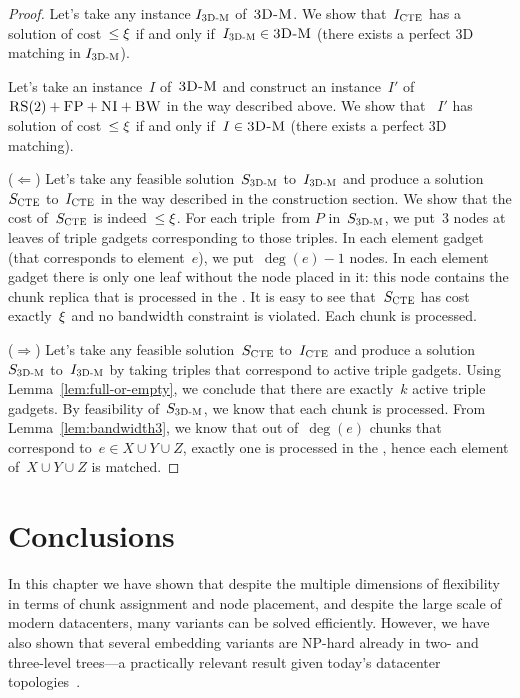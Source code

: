 \begin{proof}
  Let's take any instance $I_{\mathrm{\textsc{3D-M}}}$ of~$\textsc{3D-M}$.
  We show that~$I_{\mathrm{\textsc{CTE}}}$ has a solution of cost~$\leq \xi$ if and only if~$I_{\mathrm{\textsc{3D-M}}} \in \textsc{3D-M}$ (there exists a perfect 3D matching in $I_{\mathrm{\textsc{3D-M}}}$).


  Let's take an instance~$I$ of~$\textsc{3D-M}$ and construct an instance~$I'$
  of~$\textsc{RS}(2)+\textsc{FP}+\textsc{NI}+\textsc{BW}$ in the way described above.  We show that
 ~$I'$ has solution of cost~$\leq \xi$ if and only if~$I \in \textsc{3D-M}$
  (there exists a perfect 3D matching).

  ($\Leftarrow$) Let's take any feasible solution~$S_{\mathrm{\textsc{3D-M}}}$ to~$I_{\mathrm{\textsc{3D-M}}}$ and
  produce a solution~$S_{\mathrm{\textsc{CTE}}}$ to~$I_{\mathrm{\textsc{CTE}}}$ in the way described in the construction section. We show that the cost of~$S_{\mathrm{\textsc{CTE}}}$ is
  indeed~$\leq \xi$.
  For each triple~from $P$ in~$S_{\mathrm{\textsc{3D-M}}}$, we put~$3$ nodes at
  leaves of triple gadgets corresponding to those triples.  In each
  element gadget (that corresponds to element~$e$), we put~$\deg(e)-1$
  nodes. In each element gadget there is only one leaf without the
  node placed in it: this node contains the chunk replica that is
  processed in the {\MatchSubtree}.
  It is easy to see that~$S_{\mathrm{\textsc{CTE}}}$ has cost exactly~$\xi$ and no
  bandwidth constraint is violated. Each chunk is processed.

  ($\Rightarrow$) Let's take any feasible solution~$S_{\mathrm{\textsc{CTE}}}$ to~$I_{\mathrm{\textsc{CTE}}}$ and
  produce a solution~$S_{\mathrm{\textsc{3D-M}}}$ to~$I_{\mathrm{\textsc{3D-M}}}$ by taking triples that correspond
  to active triple gadgets. Using Lemma~\ref{lem:full-or-empty}, we
  conclude that there are exactly~$k$ active triple gadgets. By
  feasibility of~$S_{\mathrm{\textsc{3D-M}}}$, we know that each chunk is
  processed. From Lemma~\ref{lem:bandwidth3}, we know that out
  of~$\deg(e)$ chunks that correspond to~$e\in X\cup Y\cup Z$,
  exactly one is processed in the {\MatchSubtree}, hence each
  element of~$X\cup Y\cup Z$ is matched.
\end{proof}


\section{Conclusions}\label{sec:conclusion-static}


In this chapter we have shown that despite the
multiple dimensions of flexibility in terms of chunk assignment and node placement, 
and despite the large scale of modern datacenters, 
many variants can be solved efficiently. However, we have also
shown that several embedding variants are NP-hard already in two-
and three-level trees---a practically relevant result given today's datacenter topologies~\cite{fattree}.


